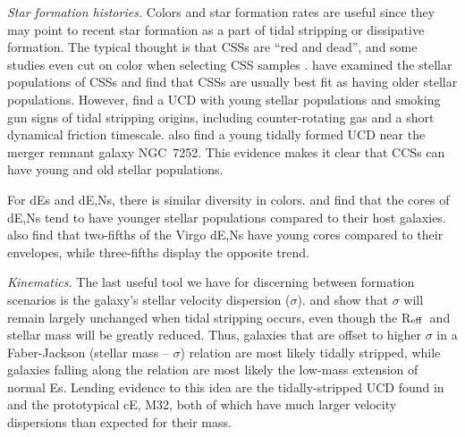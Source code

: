 \documentclass[iop,apj]{emulateapj}
\newcommand{\Reff}{R$_{\rm eff}$}
\begin{document}
\textit{Star formation histories.} 
Colors and star formation rates are useful since they may point to recent star formation as a part of tidal stripping or dissipative formation. The typical thought is that CSSs are ``red and dead'', and some studies even cut on color when selecting CSS samples \citep{Chilingarian2015}. \citet{Drinkwater2000} have examined the stellar populations of CSSs and find that CSSs are usually best fit as having older stellar populations. However, \citet{Norris2011} find a UCD with young stellar populations and smoking gun signs of tidal stripping origins, including counter-rotating gas and a short dynamical friction timescale. \citet{Maraston2004} also find a young tidally formed UCD near the merger remnant galaxy NGC~7252. This evidence makes it clear that CCSs can have young and old stellar populations.

For dEs and dE,Ns, there is similar diversity in colors. \citet{Drinkwater2000} and \citet{Ferrarese2006} find that the cores of dE,Ns tend to have younger stellar populations compared to their host galaxies. \cite{Grant2005} also find that two-fifths of the Virgo dE,Ns have young cores compared to their envelopes, while three-fifths display the opposite trend. 

\textit{Kinematics.}  The last useful tool we have for discerning between formation scenarios is the galaxy's stellar velocity dispersion ($\sigma$). \citet{Bender1992} and \citet{Bekki2003} show that $\sigma$ will remain largely unchanged when tidal stripping occurs, even though the \Reff\ and stellar mass will be greatly reduced. Thus, galaxies that are offset to higher $\sigma$ in a Faber-Jackson (stellar mass -- $\sigma$) relation \citep{faber1976} are most likely tidally stripped, while galaxies falling along the relation are most likely the low-mass extension of normal Es. Lending evidence to this idea are the tidally-stripped UCD found in \citet{Maraston2004} and the prototypical cE, M32, both of which have much larger velocity dispersions than expected for their mass.
\end{document}

